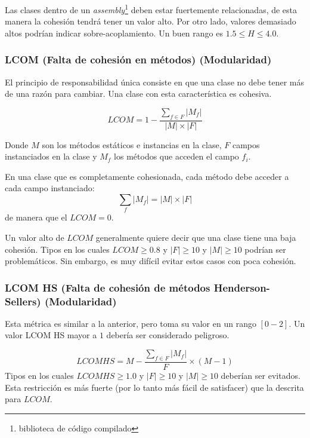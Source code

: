 Las clases dentro de un \textit{assembly}\footnote{biblioteca de código compilado} deben estar fuertemente
relacionadas, de esta manera la cohesión tendrá tener un valor alto. Por otro lado, valores demasiado altos
podrían indicar sobre-acoplamiento. Un buen rango es $1.5\leq H\leq 4.0$.

\subsubsection{LCOM (Falta de cohesión en métodos) (Modularidad)}
El principio de responsabilidad única consiste en que una clase no debe tener más de una razón para cambiar.
Una clase con esta característica es cohesiva.

\begin{equation*}
LCOM = 1 - \frac{\sum_{f\in F}\left|M_f\right|}{\left|M\right|\times\left|F\right|}
\end{equation*}

Donde $M$ son los métodos estáticos e instancias en la clase, $F$ campos instanciados en la clase y $M_f$
los métodos que acceden el campo $f_i$.

En una clase que es completamente cohesionada, cada método debe acceder a cada campo instanciado:
\begin{equation*}
\sum_f \left|M_f\right| = \left|M\right|\times\left|F\right|
\end{equation*}
de manera que el $LCOM=0$.

Un valor alto de $LCOM$ generalmente quiere decir que una clase tiene una baja cohesión. Tipos en los cuales
$LCOM\ge 0.8$ y $\left|F\right|\ge 10$ y $\left|M\right|\ge 10$ podrían ser problemáticos. Sin embargo, es
muy difícil evitar estos casos con poca cohesión.

\subsubsection{LCOM HS (Falta de cohesión de métodos Henderson-Sellers) (Modularidad)}
Esta métrica es similar a la anterior, pero toma su valor en un rango $\left[ 0-2\right]$. Un valor LCOM
HS mayor a $1$ debería ser considerado peligroso.

\begin{equation*}
LCOM HS = M - \frac{\sum_{f\in F}\left|M_f\right|}{F}\times (M-1)
\end{equation*}
Tipos en los cuales $LCOM HS\ge 1.0$ y $\left|F\right|\ge 10$ y $\left|M\right|\ge 10$ deberían ser evitados.
Esta restricción es más fuerte (por lo tanto más fácil de satisfacer) que la descrita para $LCOM$.

